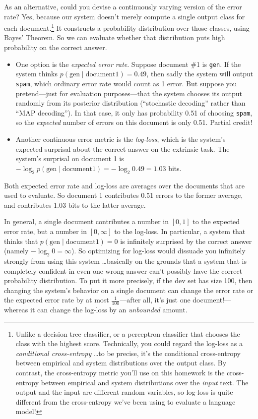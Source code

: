 \documentclass[12pt]{article}
\theoremstyle{plain}
\theoremstyle{definition}
\theoremstyle{remark}
\begin{document}
As an alternative, could you devise a continuously varying version of the error rate? Yes, because our system doesn’t merely compute a single output class for each document.\footnote{Unlike a decision tree classifier, or a perceptron classifier that chooses the class with the highest score. Technically, you could regard the log-loss as a \textit{conditional cross-entropy} \ldots to be precise, it’s the conditional cross-entropy between empirical and system distributions over the output class. By contrast, the cross-entropy metric you’ll use on this homework is the cross-entropy between empirical and system distributions over the \textit{input} text. The output and the input are different random variables, so log-loss is quite different from the cross-entropy we’ve been using to evaluate a language model!} It constructs a probability distribution over those classes, using Bayes’ Theorem. So we can evaluate whether that distribution puts high probability on the correct answer.

\begin{itemize}
    \item One option is the \textit{expected error rate}. Suppose document \#1 is \texttt{gen}. If the system thinks $p(\text{gen} \mid \text{document1}) = 0.49$, then sadly the system will output \texttt{spam}, which ordinary error rate would count as 1 error. But suppose you pretend—just for evaluation purposes—that the system chooses its output randomly from its posterior distribution (“stochastic decoding” rather than “MAP decoding”). In that case, it only has probability 0.51 of choosing \texttt{spam}, so the \textit{expected} number of errors on this document is only 0.51. Partial credit!
    
    \item Another continuous error metric is the \textit{log-loss}, which is the system’s expected surprisal about the correct answer on the extrinsic task. The system’s surprisal on document 1 is $- \log_{2} p(\text{gen} \mid \text{document1}) = -\log_{2} 0.49 = 1.03$ bits.
\end{itemize}

Both expected error rate and log-loss are averages over the documents that are used to evaluate. So document 1 contributes 0.51 errors to the former average, and contributes 1.03 bits to the latter average.

In general, a single document contributes a number in $[0,1]$ to the expected error rate, but a number in $[0,\infty]$ to the log-loss. In particular, a system that thinks that $p(\text{gen} \mid \text{document1}) = 0$ is infinitely surprised by the correct answer (namely $-\log_{2}0 = \infty$). So optimizing for log-loss would dissuade you infinitely strongly from using this system \ldots basically on the grounds that a system that is completely confident in even one wrong answer can’t possibly have the correct probability distribution. To put it more precisely, if the dev set has size 100, then changing the system’s behavior on a single document can change the error rate or the expected error rate by at most $\tfrac{1}{100}$—after all, it’s just one document!—whereas it can change the log-loss by an \textit{unbounded} amount.
\end{document}
